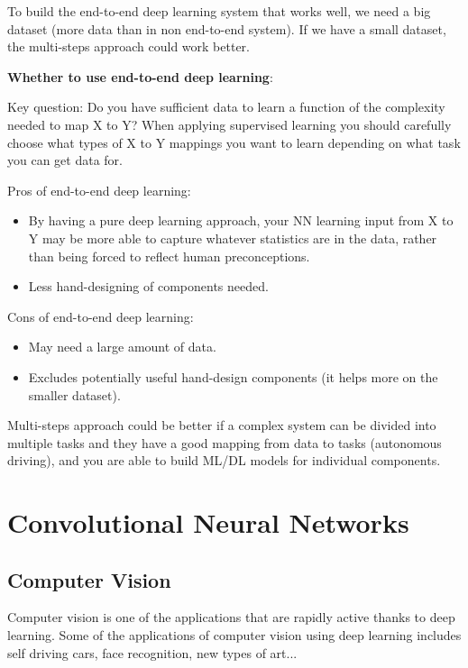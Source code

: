 \documentclass{article}
\begin{document}
\noindent To build the end-to-end deep learning system that works well, we need a big dataset (more data than in non end-to-end system). If we have a small dataset, the multi-steps approach could work better.

\bigskip

\noindent \textbf{Whether to use end-to-end deep learning}:

\noindent Key question: Do you have sufficient data to learn a function of the complexity needed to map X to Y? When applying supervised learning you should carefully choose what types of X to Y mappings you want to learn depending on what task you can get data for.

\bigskip

\noindent Pros of end-to-end deep learning:

\begin{itemize}
    \item By having a pure deep learning approach, your NN learning input from X to Y may be more able to capture whatever statistics are in the data, rather than being forced to reflect human preconceptions.
    \item Less hand-designing of components needed.
\end{itemize}

\noindent Cons of end-to-end deep learning:

\begin{itemize}
    \item May need a large amount of data.
    \item Excludes potentially useful hand-design components (it helps more on the smaller dataset).
\end{itemize}

\noindent Multi-steps approach could be better if a complex system can be divided into multiple tasks and they have a good mapping from data to tasks (autonomous driving), and you are able to build ML/DL models for individual components.

\section{Convolutional Neural Networks}

\subsection{Computer Vision}

\noindent Computer vision is one of the applications that are rapidly active thanks to deep learning. Some of the applications of computer vision using deep learning includes self driving cars, face recognition, new types of art...
\end{document}
